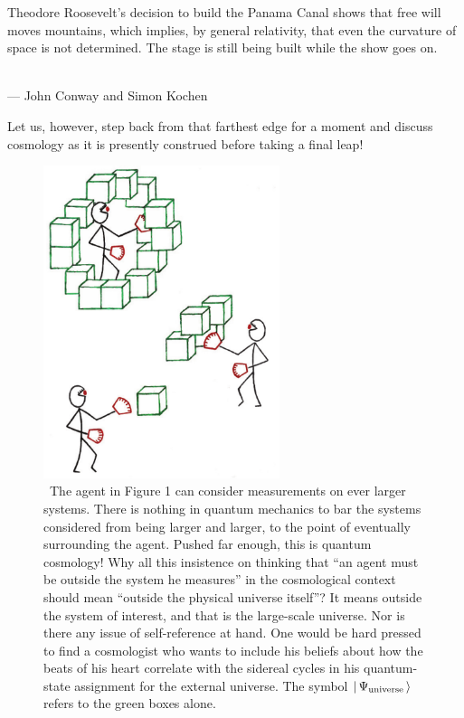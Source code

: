 \documentclass[aps,pra,superscriptaddress,10pt,tightenlines,twocolumn,nofootinbib]{revtex4}
\begin{document}
\begin{flushright}
\baselineskip=13pt
\parbox{2.8in}{\baselineskip=13pt
\small Theodore Roosevelt's decision to build the Panama Canal shows that free will
moves mountains, which implies, by general relativity, that even the
curvature of space is not determined. The stage is still being built while
the show goes on.}
\medskip\\
\small --- John Conway and Simon Kochen~\cite{Conway06}
\end{flushright}

Let us, however, step back from that farthest edge for a moment and discuss cosmology as it is presently construed before taking a final leap!

\begin{figure}
\begin{center}
\includegraphics[height=3.6in]{cosmology}
\bigskip\caption{~The agent in Figure 1 can consider measurements on ever larger systems. There is nothing in quantum mechanics to bar the systems considered from being larger and larger, to the point of eventually surrounding the agent.  Pushed far enough, this is quantum cosmology!  Why all this insistence on thinking that ``an agent must be outside the system he measures'' in the cosmological context should mean ``outside the physical universe itself''?  It means outside the system of interest, and that is the large-scale universe. Nor is there any issue of self-reference at hand.  One would be hard pressed to find a cosmologist who wants to include his beliefs about how the beats of his heart correlate with the sidereal cycles in his quantum-state assignment for the external universe.  The symbol $|\,\Psi_{\rm  universe}\,\rangle$ refers to the green boxes alone.}
\end{center}
\end{figure}
\end{document}

